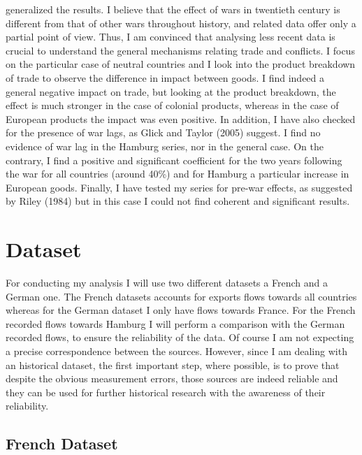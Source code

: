 \documentclass[12pt,a4paper,titlepage]{article}
\begin{document}
generalized the results. I believe that the effect of wars in twentieth century is different from that of other wars throughout history, and related data offer only a partial point of view. Thus, I am convinced that analysing less recent data is crucial to understand the general mechanisms relating trade and conflicts. I focus on the particular case of neutral countries and I look into the product breakdown of trade to observe the difference in impact between goods. I find indeed a general negative impact on trade, but looking at the product breakdown, the effect is much stronger in the case of colonial products, whereas in the case of European products the impact was even positive. In addition, I have also checked for the presence of war lags, as Glick and Taylor (2005) suggest. I find no evidence of war lag in the Hamburg series, nor in the general case. On the contrary, I find a positive and significant coefficient for the two years following the war for all countries (around 40\%) and for Hamburg a particular increase in European goods. Finally, I have tested my series for pre-war effects, as suggested by Riley (1984) but in this case I could not find coherent and significant results.


\section{Dataset}
For conducting my analysis I will use two different datasets a French and a German one. The French datasets accounts for exports flows towards all countries whereas for the German dataset I only have flows towards France. For the French recorded flows towards Hamburg I will perform a comparison with the German recorded flows, to ensure the reliability of the data. Of course I am not expecting a precise correspondence between the sources. However, since I am dealing with an historical dataset, the first important step, where possible, is to prove that despite the obvious measurement errors, those sources are indeed reliable and they can be used for further historical research with the awareness of their reliability. 
\subsection{French Dataset}
\end{document}
